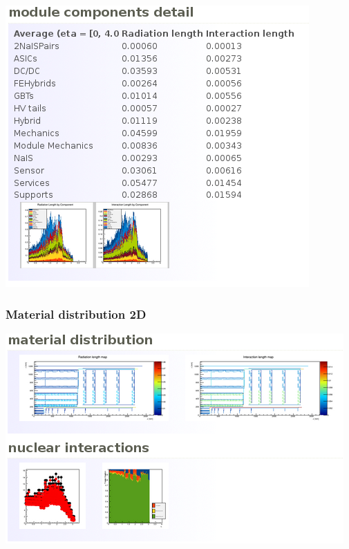 \documentclass[pdftex, 11pt]{beamer}
\begin{document}
\begin{frame}
  \begin{center}
    \includegraphics[width=\textwidth-2.5cm]{img/screenshot5.png}
  \end{center}
\end{frame}

\begin{frame}
\frametitle{Material distribution 2D}
  \begin{center}
    \includegraphics[width=\textwidth]{img/screenshot6.png}
  \end{center}
\end{frame}
\end{document}
